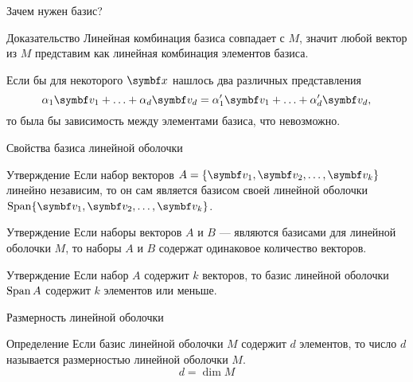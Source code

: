 \begin{frame}{Зачем нужен базис?}


\begin{block}{Доказательство}
Линейная комбинация базиса совпадает с $M$, значит любой вектор из $M$ представим
как линейная комбинация элементов базиса.
\pause

Если бы для некоторого $\bx$ нашлось два различных представления
\[
  \alpha_1 \bv_1 + \ldots + \alpha_d \bv_d = \alpha_1' \bv_1 + \ldots + \alpha_d' \bv_d,
\]
то была бы зависимость между элементами базиса, что невозможно. 
\end{block}

\end{frame}


\begin{frame}{Свойства базиса линейной оболочки}

\begin{block}{Утверждение}
Если набор векторов $A =\{ \bv_1, \bv_2, \ldots, \bv_k\}$ линейно независим, то он сам
является базисом своей линейной оболочки $\Span  \{ \bv_1, \bv_2, \ldots, \bv_k\}$.
\end{block}


\pause
\begin{block}{Утверждение}
Если наборы векторов $A$ и $B$ — являются базисами для линейной оболочки $M$,
то наборы $A$ и $B$ содержат одинаковое количество векторов. 
\end{block}
  
\pause
\begin{block}{Утверждение}
Если набор $A$ содержит $k$ векторов, 
то базис линейной оболочки $\operatorname{Span} A$ содержит $k$ элементов или меньше. 
\end{block}
  


\end{frame}


\begin{frame}{Размерность линейной оболочки}

\begin{block}{Определение}
  Если базис линейной оболочки $M$ содержит $d$ элементов, то 
  число $d$ называется \alert{размерностью линейной оболочки} $M$.
  \[
  d = \dim M  
  \] 
\end{block}
    

\end{frame}



